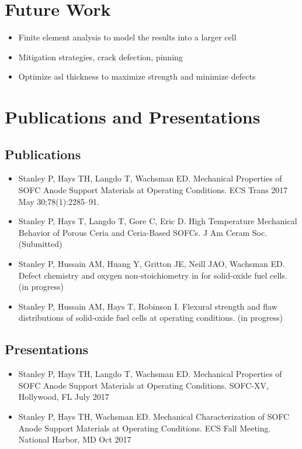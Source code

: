 \section{Future Work}
\begin{itemize}
    \item Finite element analysis to model the results into a larger cell
    \item Mitigation strategies, crack defection, pinning %
    \item Optimize \gls{asl} thickness to maximize strength and minimize defects
\end{itemize}

\section{Publications and Presentations}
    \subsection*{Publications}
        \begin{itemize}
            \item Stanley P, Hays TH, Langdo T, Wachsman ED. Mechanical Properties of SOFC Anode Support Materials at Operating Conditions. ECS Trans 2017 May 30;78(1):2285–91.
            \item Stanley P, Hays T, Langdo T, Gore C, Eric D. High Temperature Mechanical Behavior of Porous Ceria and Ceria-Based SOFCs. J Am Ceram Soc.  (Submitted)
            \item Stanley P, Hussain AM, Huang Y, Gritton JE, Neill JAO, Wachsman ED. Defect chemistry and oxygen non-stoichiometry in  for solid-oxide fuel cells. (in progress)
            \item Stanley P, Hussain AM, Hays T, Robinson I. Flexural strength and flaw distributions of  solid-oxide fuel cells at operating conditions. (in progress)
        \end{itemize}

    \subsection*{Presentations}
    \begin{itemize}
        \item Stanley P, Hays TH, Langdo T, Wachsman ED. Mechanical Properties of SOFC Anode Support Materials at Operating Conditions. SOFC-XV, Hollywood, FL  July 2017
        \item Stanley P, Hays TH,  Wachsman ED. Mechanical Characterization of SOFC Anode Support Materials at Operating Conditions. ECS Fall Meeting. National Harbor, MD Oct 2017
    \end{itemize}
